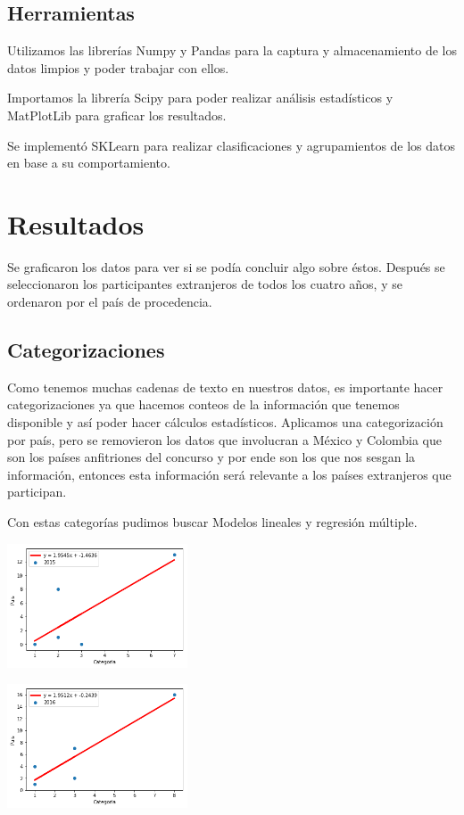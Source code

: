 \documentclass[5p,times]{elsarticle}
\begin{document}
\subsection*{Herramientas}
Utilizamos las librerías Numpy\cite{numpy} y Pandas\cite{pandas} para la captura y almacenamiento de los datos limpios y poder trabajar con ellos.

Importamos la librería Scipy\cite{scipy} para poder realizar análisis estadísticos y MatPlotLib\cite{matplotlib} para graficar los resultados.

Se implementó SKLearn\cite{sklearn} para realizar clasificaciones y agrupamientos de los datos en base a su comportamiento.




\section*{Resultados}
Se graficaron los datos para ver si se podía concluir algo sobre éstos. Después se seleccionaron los participantes extranjeros de todos los cuatro años, y se ordenaron por el país de procedencia.

\subsection*{Categorizaciones}

Como tenemos muchas cadenas de texto en nuestros datos, es importante hacer categorizaciones ya que hacemos conteos de la información que tenemos disponible y así poder hacer cálculos estadísticos. Aplicamos una categorización por país, pero se removieron los datos que involucran a México y Colombia que son los países anfitriones del concurso y por ende son los que nos sesgan la información, entonces esta información será relevante a los países extranjeros que participan. 

Con estas categorías pudimos buscar Modelos lineales y regresión múltiple.


\includegraphics[width=0.4\textwidth]{01}


\includegraphics[width=0.4\textwidth]{02}
\end{document}
